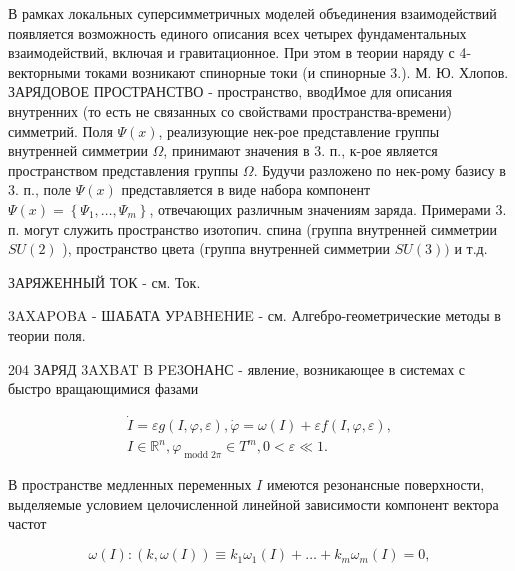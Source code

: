 \documentclass[10pt]{article}
\begin{document}
В рамках локальных суперсимметричных моделей объединения взаимодействий появляется возможность единого описания всех четырех фундаментальных взаимодействий, включая и гравитационное. При этом в теории наряду с 4-векторными токами возникают спинорные токи (и спинорные 3.). М. Ю. Хлопов. ЗАРЯДОВОЕ ПРОСТРАНСТВО - пространство, вводИмое для описания внутренних (то есть не связанных со свойствами пространства-времени) симметрий. Поля $\Psi(x)$, реализующие нек-рое представление группы внутренней симметрии $\Omega$, принимают значения в 3. п., к-рое является пространством представления группы $\Omega$. Будучи разложено по нек-рому базису в 3. п., поле $\Psi(x)$ представляется в виде набора компонент $\Psi(x)=\left\{\Psi_{1}, \ldots, \Psi_{m}\right\}$, отвечающих различным значениям заряда. Примерами 3. п. могут служить пространство изотопич. спина (группа внутренней симметрии $S U(2)$ ), пространство цвета (группа внутренней симметрии $S U(3))$ и т.д.



ЗАРЯЖЕННЫЙ ТОК - см. Ток.



3AXAPOBA - ШАБАТА УPABHEHИE - см. Алгебро-геометрические методы в теории поля.



204 ЗАРЯД 3AXBAT B PE3ОНАНС - явление, возникающее в системах с быстро вращающимися фазами



\[

\begin{gathered}

\dot{I}=\varepsilon g(I, \varphi, \varepsilon), \dot{\varphi}=\omega(I)+\varepsilon f(I, \varphi, \varepsilon), \\

I \in \mathbb{R}^{n}, \varphi_{\operatorname{modd} 2 \pi} \in T^{m}, 0<\varepsilon \ll 1 .

\end{gathered}

\]



В пространстве медленных переменных $I$ имеются резонансные поверхности, выделяемые условием целочисленной линейной зависимости компонент вектора частот



\[

\omega(I):(k, \omega(I)) \equiv k_{1} \omega_{1}(I)+\ldots+k_{m} \omega_{m}(I)=0,

\]
\end{document}
